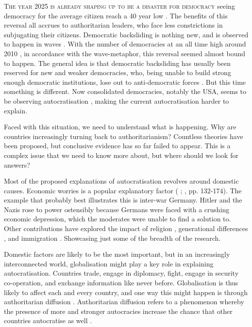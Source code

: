 \lettrine{T}{he year 2025 is already shaping up to be a disaster for democracy} seeing democracy for the average citizen reach a 40 year low \citep[p. 9]{nord_democracy_2025}. The benefits of this reversal all accrues to authoritarian leaders, who face less constrictions in subjugating their citizens. Democratic backsliding is nothing new, and is observed to happen in waves \citep{huntington_third_1991}. With the number of democracies at an all time high around 2010 \citep[pp. 10-11]{nord_democracy_2025}, in accordance with the wave-metaphor, this reversal seemed almost bound to happen. The general idea is that democratic backsliding has usually been reserved for new and weaker democracies, who, being unable to build strong enough democratic institutions, lose out to anti-democratic forces \citep{huntington_third_1991}. But this time something is different. Now consolidated democracies, notably the USA, seems to be observing autocratisation \citep{nord_democracy_2025}, making the current autocratisation harder to explain.

Faced with this situation, we need to understand what is happening. Why are countries increasingly turning back to authoritarianism? Countless theories have been proposed, but conclusive evidence has so far failed to appear. This is a complex issue that we need to know more about, but where should we look for answers? 

Most of the proposed explanations of autocratisation revolves around domestic causes. Economic worries is a popular explanatory factor (\citeauthor{lipset_chapter_1960} \citeyear{lipset_chapter_1960}; \citeauthor{norris_cultural_2019} \citeyear{norris_cultural_2019}, pp. 132-174). The example that probably best illustrates this is inter-war Germany. Hitler and the Nazis rose to power ostensibly because Germans were faced with a crushing economic depression, which the moderates were unable to find a solution to. Other contributions have explored the impact of religion \citep{huntington_third_1991}, generational differences \citep{norris_cultural_2019}, and immigration \citep[pp. 175-212]{norris_cultural_2019}. Showcasing just some of the breadth of the research. 

Domestic factors are likely to be the most important, but in an increasingly interconnected world, globalisation might play a key role in explaining autocratisation. Countries trade, engage in diplomacy, fight, engage in security co-operation, and exchange information like never before. Globalisation is thus likely to affect each and every country, and one way this might happen is through authoritarian diffusion \citep{ambrosio_constructing_2010}. Authoritarian diffusion refers to a phenomenon whereby the presence of more and stronger autocracies increase the chance that other countries autocratise as well \citep{ambrosio_constructing_2010}. 

